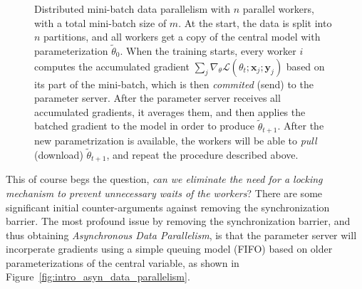 \begin{figure}[H]
  \caption{Distributed mini-batch data parallelism with $n$ parallel workers, with a total mini-batch size of $m$. At the start, the data is split into $n$ partitions, and all workers get a copy of the central model with parameterization $\tilde{\theta}_0$. When the training starts, every worker $i$ computes the accumulated gradient $\sum_j \nabla_\theta \mathcal{L}(\theta_t;\textbf{x}_j;\textbf{y}_j)$ based on its part of the mini-batch, which is then \emph{commited} (send) to the parameter server. After the parameter server receives all accumulated gradients, it averages them, and then applies the batched gradient to the model in order to produce $\tilde{\theta}_{t+1}$. After the new parametrization is available, the workers will be able to \emph{pull} (download) $\tilde{\theta}_{t+1}$, and repeat the procedure described above.}
  \label{fig:distributed_mini_batch_parallelism}
\end{figure}

This of course begs the question, \emph{can we eliminate the need for a locking mechanism to prevent unnecessary waits of the workers}? There are some significant initial counter-arguments against removing the synchronization barrier. The most profound issue by removing the synchronization barrier, and thus obtaining \emph{Asynchronous Data Parallelism}, is that the parameter server will incorperate gradients using a simple queuing model (FIFO) based on older parameterizations of the central variable, as shown in Figure~\ref{fig:intro_asyn_data_parallelism}.

